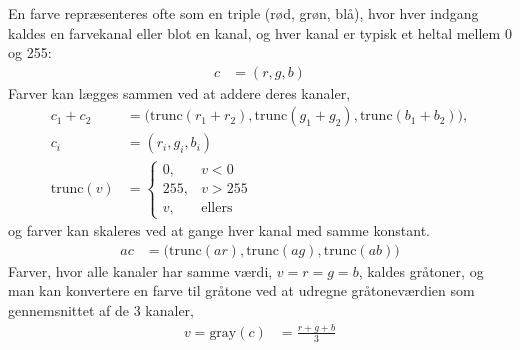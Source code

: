 En farve repræsenteres ofte som en triple (rød, grøn, blå), hvor hver indgang kaldes en farvekanal eller blot en kanal, og hver kanal er typisk et heltal mellem 0 og 255:
\begin{align}
  c &= (r, g,b)
\end{align}
Farver kan lægges sammen ved at addere deres kanaler,
\begin{align}
  c_1 + c_2 &= \big(\text{trunc}(r_1+r_2), \text{trunc}(g_1+g_2), \text{trunc}(b_1+b_2)\big),
  \\c_i &= (r_i, g_i,b_i)
  \\\text{trunc}(v) &=
  \begin{cases}
    0, &v < 0
    \\255, &v > 255
    \\v, &\text{ellers}
  \end{cases}
\end{align}
og farver kan skaleres ved at gange hver kanal med samme konstant.
\begin{align}
  a c &= \big(\text{trunc}(a r), \text{trunc}(a g), \text{trunc}(a b)\big)
\end{align}
Farver, hvor alle kanaler har samme værdi, $v=r=g=b$, kaldes gråtoner, og man kan konvertere en farve til gråtone ved at udregne gråtoneværdien som gennemsnittet af de 3 kanaler,
\begin{align}
  v = \text{gray}(c) &= \frac{r+g+b}{3}
\end{align}
